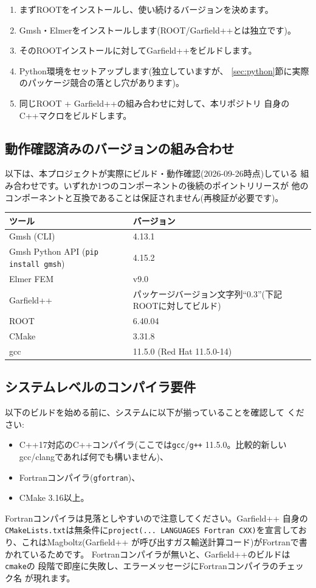 \documentclass[11pt]{ltjsarticle}
\begin{document}
\begin{enumerate}
  \item まずROOTをインストールし、使い続けるバージョンを決めます。
  \item Gmsh・Elmerをインストールします(ROOT/Garfield++とは独立です)。
  \item そのROOTインストールに対してGarfield++をビルドします。
  \item Python環境をセットアップします(独立していますが、
    \ref{sec:python}節に実際のパッケージ競合の落とし穴があります)。
  \item 同じROOT + Garfield++の組み合わせに対して、本リポジトリ
    自身のC++マクロをビルドします。
\end{enumerate}

\subsection{動作確認済みのバージョンの組み合わせ}

以下は、本プロジェクトが実際にビルド・動作確認(2026-09-26時点)している
組み合わせです。いずれか1つのコンポーネントの後続のポイントリリースが
他のコンポーネントと互換であることは保証されません(再検証が必要です)。

\begin{table}[h]
\centering
\begin{tabular}{@{}p{6.5cm}p{5cm}@{}}
\toprule
ツール & バージョン \\
\midrule
Gmsh (CLI) & 4.13.1 \\
Gmsh Python API (\texttt{pip install gmsh}) & 4.15.2 \\
Elmer FEM & v9.0 \\
Garfield++ & パッケージバージョン文字列``0.3''(下記ROOTに対してビルド) \\
ROOT & 6.40.04 \\
CMake & 3.31.8 \\
gcc & 11.5.0 (Red Hat 11.5.0-14) \\
\bottomrule
\end{tabular}
\end{table}

\subsection{システムレベルのコンパイラ要件}

以下のビルドを始める前に、システムに以下が揃っていることを確認して
ください:
\begin{itemize}
  \item C++17対応のC++コンパイラ(ここでは\texttt{gcc}/\texttt{g++}
    11.5.0。比較的新しいgcc/clangであれば何でも構いません)、
  \item Fortranコンパイラ(\texttt{gfortran})、
  \item CMake 3.16以上。
\end{itemize}
Fortranコンパイラは見落としやすいので注意してください。Garfield++
自身の\texttt{CMakeLists.txt}は無条件に\texttt{project(...
LANGUAGES Fortran CXX)}を宣言しており、これはMagboltz(Garfield++
が呼び出すガス輸送計算コード)がFortranで書かれているためです。
Fortranコンパイラが無いと、Garfield++のビルドは\texttt{cmake}の
段階で即座に失敗し、エラーメッセージにFortranコンパイラのチェック名
が現れます。
\end{document}
